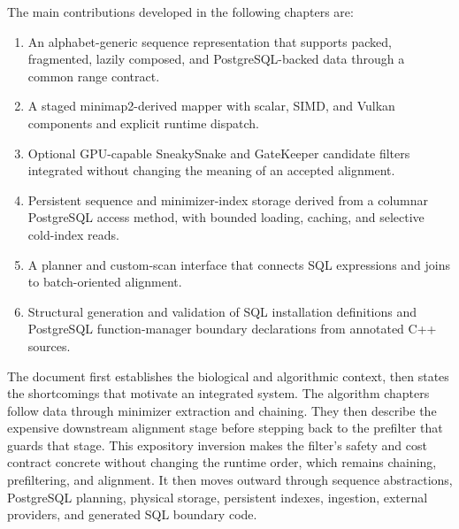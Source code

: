     The main contributions developed in the following chapters are:

    \begin{enumerate}
        \item[\textbf{C1.}] An alphabet-generic sequence representation that supports
        packed, fragmented, lazily composed, and PostgreSQL-backed data
        through a common range contract.
        \item[\textbf{C2.}] A staged minimap2-derived mapper with scalar, SIMD, and
        Vulkan components and explicit runtime dispatch.
        \item[\textbf{C3.}] Optional GPU-capable SneakySnake and GateKeeper candidate
        filters integrated without changing the meaning of an accepted
        alignment.
        \item[\textbf{C4.}] Persistent sequence and minimizer-index storage derived from
        a columnar PostgreSQL access method, with bounded loading,
        caching, and selective cold-index reads.
        \item[\textbf{C5.}] A planner and custom-scan interface that connects SQL
        expressions and joins to batch-oriented alignment.
        \item[\textbf{C6.}] Structural generation and validation of SQL installation
        definitions and PostgreSQL function-manager boundary declarations
        from annotated C++ sources.
    \end{enumerate}

    The document first
    establishes the biological and algorithmic context, then states the
    shortcomings that motivate an integrated system.  The algorithm chapters
    follow data through minimizer extraction and chaining.  They then describe
    the expensive downstream alignment stage before stepping back to the
    prefilter that guards that stage.  This expository inversion makes the
    filter's safety and cost contract concrete without changing the runtime
    order, which remains chaining, prefiltering, and alignment.
    It then moves outward through sequence abstractions, PostgreSQL
    planning, physical storage, persistent indexes, ingestion, external
    providers, and generated SQL boundary code.

    \begin{itemize}
        \setlength{\itemsep}{0pt}
        \setlength{\parsep}{0pt}
         {
        }
    \end{itemize}

